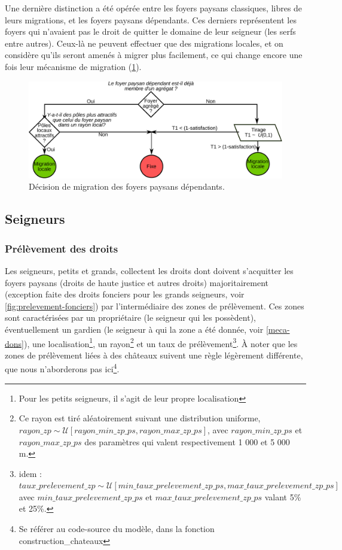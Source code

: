 Une dernière distinction a été opérée entre les foyers paysans classiques, libres de leurs migrations, et les foyers paysans \og dépendants\fg{}.
Ces derniers représentent les foyers qui n'avaient pas le droit de quitter le domaine de leur seigneur (les serfs entre autres).
Ceux-là ne peuvent effectuer que des migrations locales, et on considère qu'ils seront amenés à migrer plus facilement, ce qui change encore une fois leur mécanisme de migration (\cref{fig:choix-migration-dependants}).
\begin{figure}[H]
	\centering
	\includegraphics[width=0.9\linewidth]{img/choix_migration_dependants.pdf}
	\caption{Décision de migration des foyers paysans dépendants.}
	\label{fig:choix-migration-dependants}
\end{figure}
 

	
\subsection{Seigneurs}
	\subsubsection{Prélèvement des droits \label{sssec:collecte-droits}}
\setcounter{footnote}{\value{savefootnote}}
Les seigneurs, petits et grands, collectent les droits dont doivent s'acquitter les foyers paysans (droits de haute justice et autres droits) majoritairement (exception faite des droits fonciers pour les grands seigneurs, voir \cref{fig:prelevement-fonciers}) par l'intermédiaire des zones de prélèvement.
Ces zones sont caractérisées par un propriétaire (le seigneur qui les possèdent), éventuellement un gardien (le seigneur à qui la zone a été \og donnée\fg{}, voir \cref{meca-dons}), une localisation\footnote{
	Pour les petits seigneurs, il s'agit de leur propre localisation
}, un rayon\footnote{
	Ce rayon est tiré aléatoirement suivant une distribution uniforme, \\$rayon\_zp \sim \mathcal{U}\left[ rayon\_min\_zp\_ps , rayon\_max\_zp\_ps \right]$, avec $rayon\_min\_zp\_ps$ et $rayon\_max\_zp\_ps$ des paramètres qui valent respectivement 1 000 et 5 000 m.
} et un taux de prélèvement\footnote{
	idem : $taux\_prelevement\_zp \sim \mathcal{U}\left[ min\_taux\_prelevement\_zp\_ps , max\_taux\_prelevement\_zp\_ps \right]$ avec $min\_taux\_prelevement\_zp\_ps$ et $max\_taux\_prelevement\_zp\_ps$ valant 5\% et 25\%.
}.
À noter que les zones de prélèvement liées à des châteaux suivent une règle légèrement différente, que nous n'aborderons pas ici\footnote{Se référer au code-source du modèle, dans la fonction \textsf{construction\_chateaux}}.

